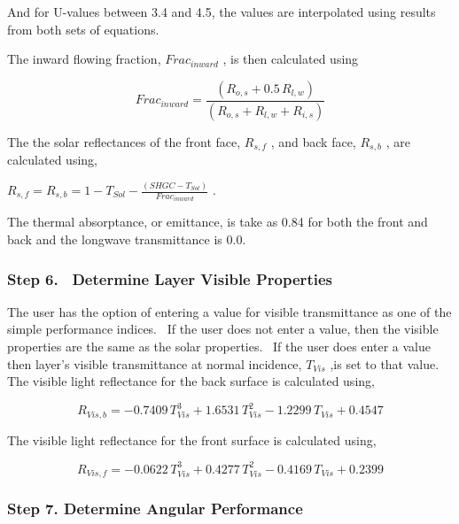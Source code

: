 And for U-values between 3.4 and 4.5, the values are interpolated using results from both sets of equations.

The inward flowing fraction, \(Fra{c_{inward}}\) , is then calculated using

\begin{equation}
Fra{c_{inward}} = \frac{{\left( {{R_{o,s}} + 0.5\,{R_{l,w}}} \right)}}{{\left( {{R_{o,s}} + {R_{l,w}} + {R_{i,s}}} \right)}}
\end{equation}

The the solar reflectances of the front face, \({R_{s,f}}\) , and back face, \({R_{s,b}}\) , are calculated using,

\({R_{s,f}} = {R_{s,b}} = 1 - {T_{Sol}} - \frac{{\left( {SHGC - {T_{Sol}}} \right)}}{{Fra{c_{inward}}}}\) .

The thermal absorptance, or emittance, is take as 0.84 for both the front and back and the longwave transmittance is 0.0.

\subsubsection{Step 6.~ Determine Layer Visible Properties}\label{step-6.-determine-layer-visible-properties}

The user has the option of entering a value for visible transmittance as one of the simple performance indices.~ If the user does not enter a value, then the visible properties are the same as the solar properties.~ If the user does enter a value then layer's visible transmittance at normal incidence, \({T_{Vis}}\) ,is set to that value.~ The visible light reflectance for the back surface is calculated using,

\begin{equation}
{R_{Vis,b}} =  - 0.7409\,T_{Vis}^3 + 1.6531\,T_{Vis}^2 - 1.2299\,{T_{Vis}} + 0.4547
\end{equation}

The visible light reflectance for the front surface is calculated using,

\begin{equation}
{R_{Vis,f}} =  - 0.0622\,T_{Vis}^3 + 0.4277\,T_{Vis}^2 - 0.4169\,{T_{Vis}} + 0.2399
\end{equation}

\subsubsection{Step 7. Determine Angular Performance}\label{step-7.-determine-angular-performance}

